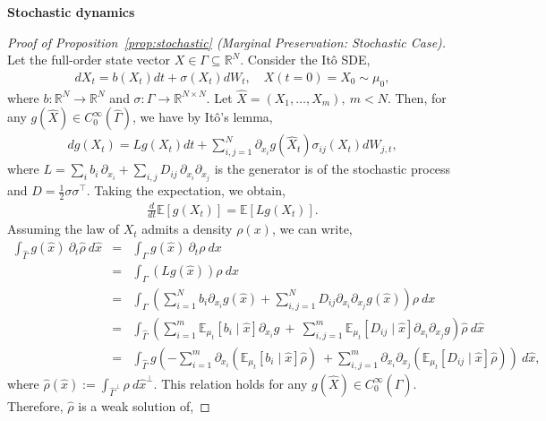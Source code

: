 \documentclass[11pt, a4paper, oneside, reqno]{amsart}
\begin{document}
\noindent\textbf{Stochastic dynamics}\label{app:surrogate sde}
\begin{proof}[Proof of Proposition~\ref{prop:stochastic} (Marginal Preservation: Stochastic Case)]
    Let the full-order state vector $X\in\Gamma \subseteq \mathbb{R}^N$. Consider the Itô SDE, 
    \begin{eqnarray}
        dX_t = b(X_t)dt+\sigma(X_t)dW_t, \quad X(t=0) = X_0 \sim \mu_0,
    \end{eqnarray}
    where $b:\mathbb{R}^N\to\mathbb{R}^N$ and $\sigma:\Gamma\to\mathbb{R}^{N\times N}$. Let $\hat{X}=(X_1,\dots,X_m), \ m<N$.
    Then, for any $g(\hat{X})\in C_0^\infty(\hat{\Gamma})$, we have by Itô's lemma,
    \begin{eqnarray}
        dg(X_t) = Lg(X_t)dt + \sum_{i,j=1}^N\partial_{x_i}g(\hat{X}_t)\sigma_{ij}({X}_t)dW_{j,t},
    \end{eqnarray}
    where $ L=\sum_i b_i \,\partial_{x_i} + \sum_{i,j} D_{ij}\,\partial_{x_i}\partial_{x_j}$ is the generator is of the stochastic process and $D=\tfrac12 \sigma\sigma^\top$. Taking the expectation, we obtain,
    \begin{eqnarray}
        \frac{d}{dt}\mathbb{E}[g(X_t)]=\mathbb{E}[Lg(X_t)].
    \end{eqnarray}
    Assuming the law of $X_t$ admits a density $\rho(x)$, we can write,
    \begin{eqnarray}
        \int_{\hat{\Gamma}} g(\hat{x}) \ \partial_t\hat{\rho} \ d\hat{x} 
        &=&\int_\Gamma g(\hat{x}) \ \partial_t\rho \ dx  \nonumber\\
        &=& \int_\Gamma (Lg(\hat{x})) \rho \ dx\nonumber\\
        &=& \int_\Gamma (\sum_{i=1}^N b_i\partial_{x_i}g(\hat{x}) +\sum_{i,j=1}^N D_{ij}\partial_{x_i}\partial_{x_j} g(\hat{x}))\rho \ dx \nonumber\\
        &=&\int_{\hat{\Gamma}} \left(\sum_{i=1}^m\mathbb{E}_{\mu_t}[b_i\mid \hat{x}] \partial_{x_i}g \ + \ \sum_{i,j=1}^m \mathbb{E}_{\mu_t}[D_{ij}\mid \hat{x}]\partial_{x_i}\partial_{x_j} g \right)\hat{\rho} \ d\hat{x} \nonumber\\
        &=& \int_{\hat{\Gamma}} g \left(-\sum_{i=1}^m\partial_{x_i}(\mathbb{E}_{\mu_t}[b_i\mid \hat{x}]\hat{\rho})\ + \sum_{i,j=1}^m \partial_{x_i}\partial_{x_j}(\mathbb{E}_{\mu_t}[D_{ij}\mid \hat{x}] \hat{\rho}) \right)\ d\hat{x},
    \end{eqnarray}
    where $\hat{\rho}(\hat{x}):=\int_{\hat{\Gamma}^\perp}\rho\ d\hat{x}^\perp$. This relation holds for any $g(\hat{X})\in C_0^\infty(\hat{\Gamma})$. Therefore, $\hat{\rho}$ is a weak solution of, 

\end{proof}
\end{document}
